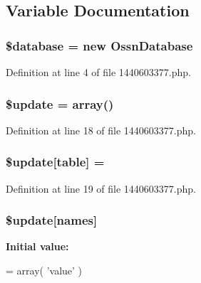 \subsection{Variable Documentation}
\subsubsection[{\texorpdfstring{\$database}{$database}}]{\setlength{\rightskip}{0pt plus 5cm}\${\bf database} = new {\bf Ossn\+Database}}\hypertarget{1440603377_8php_a7691c0162d89de0b6ba47edcd8ba8878}{}\label{1440603377_8php_a7691c0162d89de0b6ba47edcd8ba8878}


Definition at line 4 of file 1440603377.\+php.

\subsubsection[{\texorpdfstring{\$update}{$update}}]{\setlength{\rightskip}{0pt plus 5cm}\${\bf update} = array()}\hypertarget{1440603377_8php_a13a7db07df65d01cfbca768f443084cc}{}\label{1440603377_8php_a13a7db07df65d01cfbca768f443084cc}


Definition at line 18 of file 1440603377.\+php.

\subsubsection[{\texorpdfstring{\$update}{$update}}]{\setlength{\rightskip}{0pt plus 5cm}\${\bf update}\mbox{[}\textquotesingle{}table\textquotesingle{}\mbox{]} = \textquotesingle{}}\hypertarget{1440603377_8php_aee7ba5985ddf023a93862ab77e9718f9}{}\label{1440603377_8php_aee7ba5985ddf023a93862ab77e9718f9}


Definition at line 19 of file 1440603377.\+php.

\subsubsection[{\texorpdfstring{\$update}{$update}}]{\setlength{\rightskip}{0pt plus 5cm}\${\bf update}\mbox{[}\textquotesingle{}names\textquotesingle{}\mbox{]}}\hypertarget{1440603377_8php_abcf5ad2e4fef35de04bef0168cc91ddc}{}\label{1440603377_8php_abcf5ad2e4fef35de04bef0168cc91ddc}
{\bfseries Initial value\+:}
\begin{DoxyCode}
= array(
        \textcolor{stringliteral}{'value'}
)
\end{DoxyCode}


